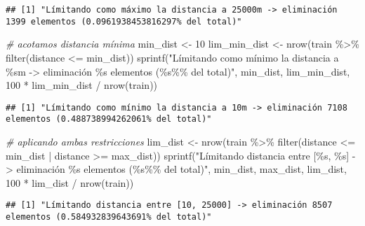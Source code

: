 \documentclass[
]{article}
\newenvironment{Shaded}{\begin{snugshade}}{\end{snugshade}}
\newcommand{\CommentTok}[1]{\textcolor[rgb]{0.56,0.35,0.01}{\textit{#1}}}
\newcommand{\DecValTok}[1]{\textcolor[rgb]{0.00,0.00,0.81}{#1}}
\newcommand{\FunctionTok}[1]{\textcolor[rgb]{0.00,0.00,0.00}{#1}}
\newcommand{\NormalTok}[1]{#1}
\newcommand{\OtherTok}[1]{\textcolor[rgb]{0.56,0.35,0.01}{#1}}
\newcommand{\SpecialCharTok}[1]{\textcolor[rgb]{0.00,0.00,0.00}{#1}}
\newcommand{\StringTok}[1]{\textcolor[rgb]{0.31,0.60,0.02}{#1}}
\begin{document}
\begin{verbatim}
## [1] "Límitando como máximo la distancia a 25000m -> eliminación 1399 elementos (0.0961938453816297% del total)"
\end{verbatim}

\begin{Shaded}
\begin{Highlighting}[]
\CommentTok{\# acotamos distancia mínima}
\NormalTok{min\_dist }\OtherTok{\textless{}{-}} \DecValTok{10}
\NormalTok{lim\_min\_dist }\OtherTok{\textless{}{-}} \FunctionTok{nrow}\NormalTok{(train }\SpecialCharTok{\%\textgreater{}\%} \FunctionTok{filter}\NormalTok{(distance }\SpecialCharTok{\textless{}=}\NormalTok{ min\_dist))}
\FunctionTok{sprintf}\NormalTok{(}\StringTok{"Límitando como mínimo la distancia a \%sm {-}\textgreater{} eliminación \%s elementos (\%s\%\% del total)"}\NormalTok{, min\_dist, lim\_min\_dist, }\DecValTok{100} \SpecialCharTok{*}\NormalTok{ lim\_min\_dist }\SpecialCharTok{/} \FunctionTok{nrow}\NormalTok{(train))}
\end{Highlighting}
\end{Shaded}

\begin{verbatim}
## [1] "Límitando como mínimo la distancia a 10m -> eliminación 7108 elementos (0.488738994262061% del total)"
\end{verbatim}

\begin{Shaded}
\begin{Highlighting}[]
\CommentTok{\# aplicando ambas restricciones}
\NormalTok{lim\_dist }\OtherTok{\textless{}{-}} \FunctionTok{nrow}\NormalTok{(train }\SpecialCharTok{\%\textgreater{}\%} \FunctionTok{filter}\NormalTok{(distance }\SpecialCharTok{\textless{}=}\NormalTok{ min\_dist }\SpecialCharTok{|}\NormalTok{ distance }\SpecialCharTok{\textgreater{}=}\NormalTok{ max\_dist))}
\FunctionTok{sprintf}\NormalTok{(}\StringTok{"Límitando distancia entre [\%s, \%s] {-}\textgreater{} eliminación \%s elementos (\%s\%\% del total)"}\NormalTok{, min\_dist, max\_dist, lim\_dist, }\DecValTok{100} \SpecialCharTok{*}\NormalTok{ lim\_dist }\SpecialCharTok{/} \FunctionTok{nrow}\NormalTok{(train))}
\end{Highlighting}
\end{Shaded}

\begin{verbatim}
## [1] "Límitando distancia entre [10, 25000] -> eliminación 8507 elementos (0.584932839643691% del total)"
\end{verbatim}
\end{document}

